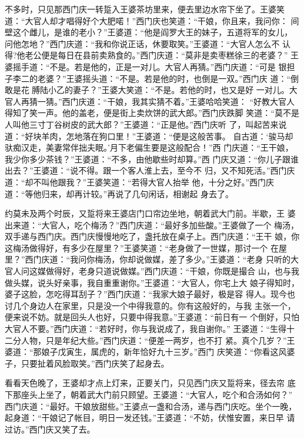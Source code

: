 不多时，只见那西门庆一转踅入王婆茶坊里来，便去里边水帘下坐了。王婆笑
道：“大官人却才唱得好个大肥喏！”西门庆也笑道：“干娘，你且来，我问你：
间壁这个雌儿，是谁的老小？”王婆道：“他是阎罗大王的妹子，五道将军的女儿，
问他怎地？”西门庆道：“我和你说正话，休要取笑。”王婆道：“大官人怎么不
认得?他老公便是每日在县前卖熟食的。”西门庆道：“莫非是卖枣糕徐三的老婆？”
王婆摇手道：“不是。若是他的，正是一对儿。大官人再猜。”西门庆道：“可是
银担子李二的老婆？”王婆摇头道：“不是。若是他的时，也倒是一双。”西门庆
道：“倒敢是花膊陆小乙的妻子？”王婆大笑道：“不是。若他的时，也又是好
一对儿。大官人再猜一猜。”西门庆道：“干娘，我其实猜不着。”王婆哈哈笑道：
“好教大官人得知了笑一声。他的盖老，便是街上卖炊饼的武大郎。”西门庆跌脚
笑道：“莫不是人叫他三寸丁谷树皮的武大郎？”王婆道：“正是他。”西门庆听
了，叫起苦来说道：“好块羊肉，怎地落在狗口里！”王婆道：“便是这般苦事。
自古道：‘骏马却驮痴汉走，美妻常伴拙夫眠。’月下老偏生要是这般配合！”西
门庆道：“王干娘，我少你多少茶钱？”王婆道：“不多，由他歇些时却算。”西
门庆又道：“你儿子跟谁出去？”王婆道：“说不得。跟一个客人淮上去，至今不
归，又不知死活。”西门庆道：“却不叫他跟我？”王婆笑道：“若得大官人抬举
他，十分之好。”西门庆道：“等他归来，却再计较。”再说了几句闲话，相谢起
身去了。

约莫未及两个时辰，又踅将来王婆店门口帘边坐地，朝着武大门前。半歇，王
婆出来道：“大官人，吃个梅汤？”西门庆道：“最好多加些酸。”王婆做了一个
梅汤，双手递与西门庆。西门庆慢慢地吃了，盏托放在桌子上。西门庆道：“王干
娘，你这梅汤做得好，有多少在屋里？”王婆笑道：“老身做了一世媒，那讨一个
在屋里？”西门庆道：“我问你梅汤，你却说做媒，差了多少。”王婆道：“老身
只听的大官人问这媒做得好，老身只道说做媒。”西门庆道：“干娘，你既是撮合
山，也与我做头媒，说头好亲事，我自重重谢你。”王婆道：“大官人，你宅上大
娘子得知时，婆子这脸，怎吃得耳刮子？”西门庆道：“我家大娘子最好，极是容
得人。现今也讨几个身边人在家里，只是没一个中得我意的。你有这般好的，与我
主张一个，便来说不妨。就是回头人也好，只要中得我意。”王婆道：“前日有一
个倒好，只怕大官人不要。”西门庆道：“若好时，你与我说成了，我自谢你。”
王婆道：“生得十二分人物，只是年纪大些。”西门庆道：“便差一两岁，也不打
紧。真个几岁？”王婆道：“那娘子戊寅生，属虎的，新年恰好九十三岁。”西门
庆笑道：“你看这风婆子，只要扯着风脸取笑。”西门庆笑了起身去。

看看天色晚了，王婆却才点上灯来，正要关门，只见西门庆又踅将来，径去帘
底下那座头上坐了，朝着武大门前只顾望。王婆道：“大官人，吃个和合汤如何？”
西门庆道：“最好。干娘放甜些。”王婆点一盏和合汤，递与西门庆吃。坐个一晚，
起身道：“干娘记了帐目，明日一发还钱。”王婆道：“不妨，伏惟安置，来日早
请过访。”西门庆又笑了去。

